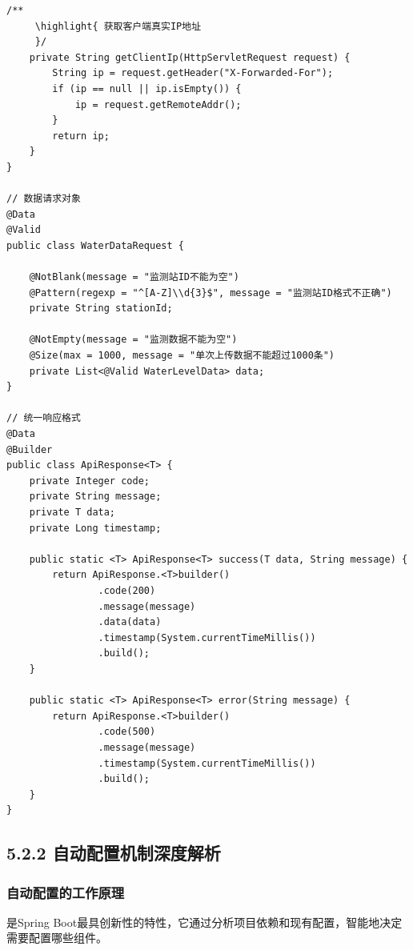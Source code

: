 \begin{lstlisting}[style=java]
    /**
     \highlight{ 获取客户端真实IP地址
     }/
    private String getClientIp(HttpServletRequest request) {
        String ip = request.getHeader("X-Forwarded-For");
        if (ip == null || ip.isEmpty()) {
            ip = request.getRemoteAddr();
        }
        return ip;
    }
}

// 数据请求对象
@Data
@Valid
public class WaterDataRequest {
    
    @NotBlank(message = "监测站ID不能为空")
    @Pattern(regexp = "^[A-Z]\\d{3}$", message = "监测站ID格式不正确")
    private String stationId;
    
    @NotEmpty(message = "监测数据不能为空")
    @Size(max = 1000, message = "单次上传数据不能超过1000条")
    private List<@Valid WaterLevelData> data;
}

// 统一响应格式
@Data
@Builder
public class ApiResponse<T> {
    private Integer code;
    private String message;
    private T data;
    private Long timestamp;
    
    public static <T> ApiResponse<T> success(T data, String message) {
        return ApiResponse.<T>builder()
                .code(200)
                .message(message)
                .data(data)
                .timestamp(System.currentTimeMillis())
                .build();
    }
    
    public static <T> ApiResponse<T> error(String message) {
        return ApiResponse.<T>builder()
                .code(500)
                .message(message)
                .timestamp(System.currentTimeMillis())
                .build();
    }
}
\end{lstlisting}

\hypertarget{ux81eaux52a8ux914dux7f6eux673aux5236ux6df1ux5ea6ux89e3ux6790}{%
\subsection{5.2.2 自动配置机制深度解析}\label{ux81eaux52a8ux914dux7f6eux673aux5236ux6df1ux5ea6ux89e3ux6790}}

\hypertarget{ux81eaux52a8ux914dux7f6eux7684ux5de5ux4f5cux539fux7406}{%
\subsubsection{自动配置的工作原理}\label{ux81eaux52a8ux914dux7f6eux7684ux5de5ux4f5cux539fux7406}}

是Spring Boot最具创新性的特性，它通过分析项目依赖和现有配置，智能地决定需要配置哪些组件。

